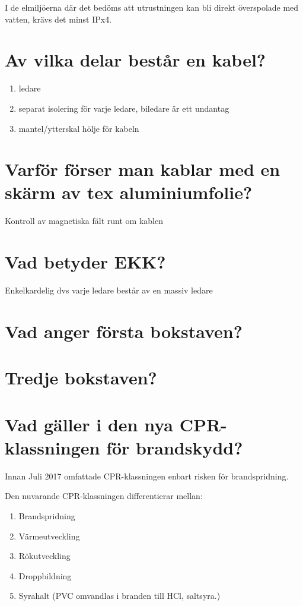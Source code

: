 \documentclass[a4paper,swedish]{article}
\begin{document}
I de elmiljöerna där det bedöms att utrustningen kan bli direkt överspolade med vatten, krävs det minst IPx4.

\setcounter{section}{10}
\section{Av vilka delar består en kabel?}

\begin{enumerate}
\item ledare
\item separat isolering för varje ledare, biledare är ett undantag
\item mantel/ytterskal hölje för kabeln
\end{enumerate}

\setcounter{section}{12}
\section{Varför förser man kablar med en skärm av tex aluminiumfolie?}

Kontroll av magnetiska fält runt om kablen

\setcounter{section}{14}
\section{Vad betyder EKK?}

Enkelkardelig dvs varje ledare består av en massiv ledare

\setcounter{section}{16}
\section{Vad anger första bokstaven?}

\setcounter{section}{18}
\section{Tredje bokstaven?}

\setcounter{section}{20}
\section{Vad gäller i den nya CPR-klassningen för brandskydd?}

Innan Juli 2017 omfattade CPR-klassningen enbart risken för brandspridning.

Den nuvarande CPR-klassningen differentierar mellan:

\begin{center}
  \begin{enumerate}
  \item Brandspridning
  \item Värmeutveckling
  \item Rökutveckling
  \item Droppbildning
  \item Syrahalt (PVC omvandlas i branden till HCl, saltsyra.)
  \end{enumerate}
\end{center}
\end{document}
